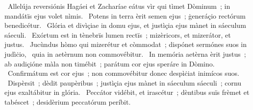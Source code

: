 {~Allelúja reversiónis Hagáei et Zacharíae}
{%
eátus vìr qui tìmet Dòminum~; in mandátïs ejus volet nìmis.
~Potens in terra èrit semen ejus~; ġeneráçio rectórum benedicétur.
~Glória et divìçiae in domu ejus, et justìçia ejus mànet in sáeculum sáeculi.
~Exórtum est in tènebrïs lumen rectïs~; mizèricors, et mizerátor, et justus.
~Jucùndus hòmo qui mizerétur et còmmodat~; dispónet sermónes suos in judìċio,
~quia in aetèrnum non commovébitur.
~In memória aetèrna èrit justus~; ab audiçióne màla non timébit~; parátum cor ejus speráre in Dòmino.
~Confirmátum est cor ejus~; non commovébitur donec despìċiat inimícos suos.
~Dispèrsit~; dèdit paupèribus~; justìçia ejus mànet in sáeculum sáeculi~; cornu ejus exaltábitur in glória.
~Peccátor vidébit, et irascétur~; dèntibus suïs frèmet et tabéscet~; desidèrium peccatórum períbit.}

